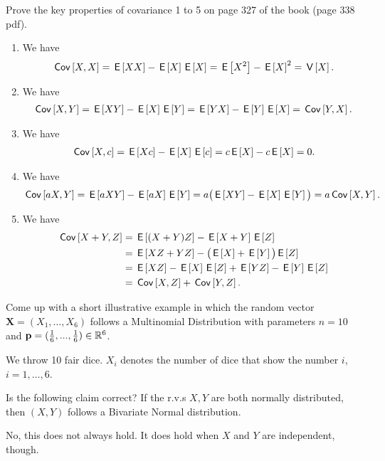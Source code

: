 \documentclass[assignments]{subfiles}
\begin{document}
\begin{exercise}
Prove the key properties of covariance 1 to 5 on page 327 of the book (page 338 pdf).
\begin{solution}
\begin{enumerate}
    \item We have
    \begin{align}
        \cov{X,X} = \E{XX} - \E{X}\E{X} = \E{X^2} - \E{X}^2 = \V{X}.
    \end{align}
    \item We have
    \begin{align}
        \cov{X,Y} = \E{XY} - \E{X}\E{Y} = \E{YX} - \E{Y} \E{X} = \cov{Y, X}.
    \end{align}
    \item We have
    \begin{align}
        \cov{X,c} = \E{Xc} - \E{X}\E{c} = c\E{X} - c\E{X} = 0.
    \end{align}
    \item We have
    \begin{align}
        \cov{aX,Y} = \E{aXY} - \E{aX}\E{Y} = a\big(\E{XY} - \E{X}\E{Y}\big) = a\cov{X,Y}.
    \end{align}
    \item We have
    \begin{align}
        \cov{X+Y, Z} &= \E{(X + Y)Z} - \E{X+Y}\E{Z} \\
        &= \E{XZ + YZ} - \big(\E{X} + \E{Y}\big) \E{Z}\\
        &= \E{XZ} - \E{X}\E{Z} + \E{YZ} - \E{Y}\E{Z} \\
        &= \cov{X,Z} + \cov{Y,Z}.
    \end{align}
\end{enumerate}
\end{solution}
\end{exercise}

\begin{exercise}
Come up with a short illustrative example in which the random vector $\mathbf{X} = (X_1, \ldots, X_6)$ follows a Multinomial Distribution with parameters  $n=10$ and $\mathbf{p}=(\frac{1}{6}, ..., \frac{1}{6}) \in \R^{6}$.
\begin{solution}
We throw 10 fair dice. $X_i$ denotes the number of dice that show the number $i$, $i=1,\ldots,6$.
\end{solution}
\end{exercise}

\begin{exercise}
Is the following claim correct? If the r.v.s $X, Y$ are both normally distributed, then $(X, Y)$ follows a Bivariate Normal distribution.
\begin{solution}
No, this does not always hold. It does hold when $X$ and $Y$ are independent, though.
\end{solution}
\end{exercise}
\end{document}
